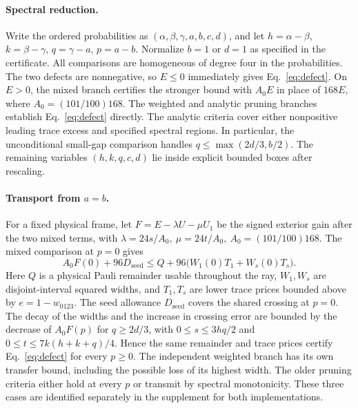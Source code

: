 \documentclass[11pt]{article}
\begin{document}
\paragraph{Spectral reduction.}
Write the ordered probabilities as \((\alpha,\beta,\gamma,a,b,c,d)\),
and let \(h=\alpha-\beta\), \(k=\beta-\gamma\), \(q=\gamma-a\),
\(p=a-b\). Normalize \(b=1\) or \(d=1\) as specified in the certificate.
All comparisons are homogeneous of degree four in the probabilities.
The two defects are nonnegative, so \(E\le0\) immediately gives
Eq.~\eqref{eq:defect}. On \(E>0\), the mixed branch certifies the
stronger bound with \(A_0E\) in place of \(168E\), where
\(A_0=(101/100)168\). The weighted and analytic pruning branches
establish Eq.~\eqref{eq:defect} directly. The analytic criteria
cover either nonpositive leading trace excess and specified spectral regions.
In particular, the unconditional small-gap comparison handles
\(q\le\max(2d/3,b/2)\). The remaining variables
\((h,k,q,c,d)\) lie inside explicit bounded boxes after rescaling.

\paragraph{Transport from \(a=b\).}
For a fixed physical frame, let \(F=E-\lambda U-\mu U_1\) be
the signed exterior gain after the two mixed terms, with
\(\lambda=24s/A_0,\ \mu=24t/A_0,\ A_0=(101/100)168\).
The mixed comparison at \(p=0\) gives
\[
 A_0F(0)+96D_{\mathrm{seed}}
 \le Q+96\big(W_1(0)T_1+W_s(0)T_s\big).
\]
Here \(Q\) is a physical Pauli remainder usable throughout the ray,
\(W_1,W_s\) are disjoint-interval squared widths, and \(T_1,T_s\)
are lower trace prices bounded above by \(e=1-w_{0123}\).
The seed allowance \(D_{\mathrm{seed}}\) covers the shared
crossing at \(p=0\). The decay of the widths and the increase in
crossing error are bounded by the decrease of \(A_0F(p)\) for
\(q\ge2d/3\), with \(0\le s\le3hq/2\) and
\(0\le t\le7k(h+k+q)/4\). Hence the same remainder and trace
prices certify Eq.~\eqref{eq:defect} for every \(p\ge0\).
The independent weighted branch has its own transfer bound,
including the possible loss of its highest width. The older
pruning criteria either hold at every \(p\) or transmit by spectral
monotonicity. These three cases are identified separately in the
supplement for both implementations.
\end{document}
